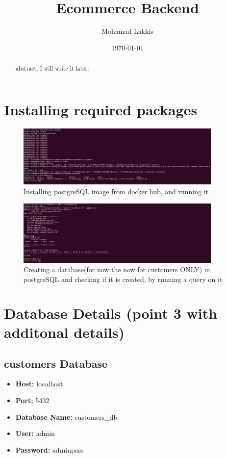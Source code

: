 \documentclass{article}
\title{Ecommerce Backend}
\author{Mohamad Lakkis}
\date{\today}
\begin{document}
\maketitle

\begin{abstract}
abstract, I will write it later.
\end{abstract}

\section{Installing required packages}
\begin{figure}[H]
\centering
\includegraphics[width=0.9\textwidth]{images/1.png}
\caption{Installing postgreSQL image from docker hub, and running it} 
\end{figure}
\begin{figure}[H]
\centering
\includegraphics[width=0.9\textwidth]{images/2.png}
\caption{Creating a database(for now the now for customers ONLY) in postgreSQL and checking if it is created, by running a query on it}
\end{figure}
\section{Database Details (point 3 with additonal details)}
\subsection{customers Database}
\begin{itemize}
  \item \textbf{Host:} localhost
  \item \textbf{Port:} 5432
  \item \textbf{Database Name:} customers\_db
  \item \textbf{User:} admin
  \item \textbf{Password:} adminpass
\end{itemize}
\end{document}
